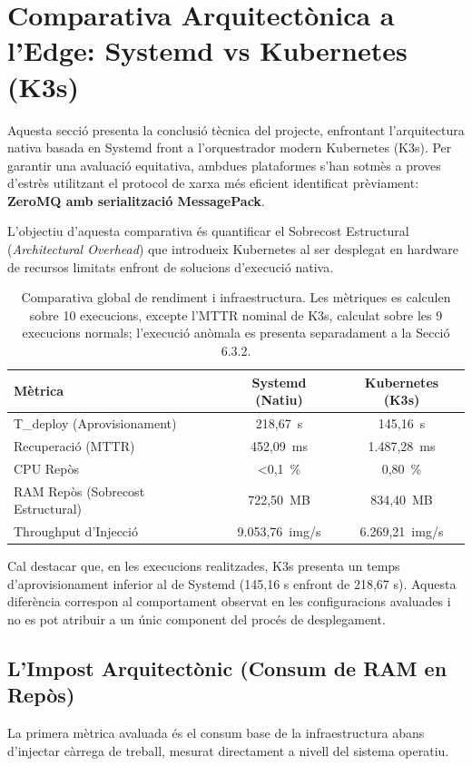 \section{Comparativa Arquitectònica a l'Edge: Systemd vs Kubernetes (K3s)}
\label{sec:comparativa_arquitectonica}

Aquesta secció presenta la conclusió tècnica del projecte, enfrontant l'arquitectura nativa basada en Systemd front a l'orquestrador modern Kubernetes (K3s). Per garantir una avaluació equitativa, ambdues plataformes s'han sotmès a proves d'estrès utilitzant el protocol de xarxa més eficient identificat prèviament: \textbf{ZeroMQ amb serialització MessagePack}.

L'objectiu d'aquesta comparativa és quantificar el Sobrecost Estructural (\textit{Architectural Overhead}) que introdueix Kubernetes al ser desplegat en hardware de recursos limitats enfront de solucions d'execució nativa.

\begin{table}[h]
    \centering
    \renewcommand{\arraystretch}{1.2}
    \begin{tabular}{l c c}
    \toprule
    \textbf{Mètrica} & \textbf{Systemd (Natiu)} & \textbf{Kubernetes (K3s)} \\
    \midrule
    T\_deploy (Aprovisionament) & 218,67~s & 145,16~s \\
    Recuperació (MTTR) & 452,09~ms & 1.487,28~ms \\
    CPU Repòs & <0,1~\% & 0,80~\% \\
    RAM Repòs (Sobrecost Estructural) & 722,50~MB & 834,40~MB \\
    Throughput d'Injecció & 9.053,76~img/s & 6.269,21~img/s \\
    \bottomrule
    \end{tabular}
    \caption{Comparativa global de rendiment i infraestructura. Les mètriques es calculen sobre 10 execucions, excepte l'MTTR nominal de K3s, calculat sobre les 9 execucions normals; l'execució anòmala es presenta separadament a la Secció 6.3.2.}
    \label{tab:comparativa_final}
\end{table}

Cal destacar que, en les execucions realitzades, K3s presenta un temps d'aprovisionament inferior al de Systemd (145,16 s enfront de 218,67 s). 
Aquesta diferència correspon al comportament observat en les configuracions avaluades i no es pot atribuir a un únic component del procés de desplegament.

\subsection{L'Impost Arquitectònic (Consum de RAM en Repòs)}
La primera mètrica avaluada és el consum base de la infraestructura abans d'injectar càrrega de treball, mesurat directament a nivell del sistema operatiu.

